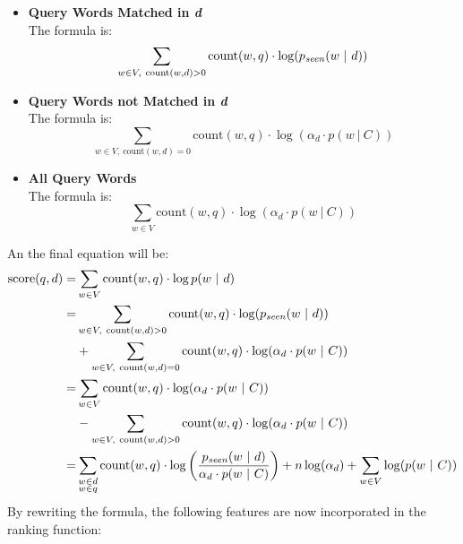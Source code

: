 \documentclass{article}
\begin{document}
\begin{itemize}
	\item \textbf{Query Words Matched in \textit{d}}
	\vspace{.2cm} \\
	The formula is:
	\[ \sum_{w \in V,~\text{count}(w, d) > 0} \text{count}(w, q) \cdot \log(p_{\text{\textit{seen}}}(w~|~d)) \]
	
	\item \textbf{Query Words not Matched in \textit{d}}
	\vspace{.2cm} \\
	The formula is:
	\[ \sum_{w \in V,~\text{count}(w, d) = 0} \text{count}(w,q) \cdot \log (\alpha_d \cdot p(w~|~C)) \]
	
	\item \textbf{All Query Words}
	\vspace{.2cm} \\
	The formula is:
	\[ \sum_{w \in V} \text{count}(w, q) \cdot \log (\alpha_d \cdot p(w~|~C)) \]
\end{itemize}
An the final equation will be:
\begin{align*}
	\text{score}(q,d)  = & \sum_{w \in V} \text{count}(w, q) \cdot \log p(w~|~d) \\
	= & \sum_{w \in V,~\text{count}(w, d) > 0} \text{count}(w, q) \cdot \log(p_{\text{\textit{seen}}}(w~|~d)) \\
	& + \sum_{w \in V,~\text{count}(w, d) = 0} \text{count}(w,q) \cdot \log (\alpha_d \cdot p(w~|~C)) \\
	= & \sum_{w \in V} \text{count}(w, q) \cdot \log (\alpha_d \cdot p(w~|~C)) \\
	& - \sum_{w \in V,~\text{count}(w, d) > 0} \text{count}(w, q) \cdot \log (\alpha_d \cdot p(w~|~C)) \\
	= & \sum_{\substack{w \in d \\ w \in q}} \text{count}(w,q) \cdot \log \left( \frac{p_\text{\textit{seen}}(w~|~d)}{\alpha_d \cdot p(w~|~C)} \right) + n \log (\alpha_d) + \sum_{w \in V} \log(p(w~|~C))
\end{align*}
By rewriting the formula, the following features are now incorporated in the ranking function:
\end{document}
